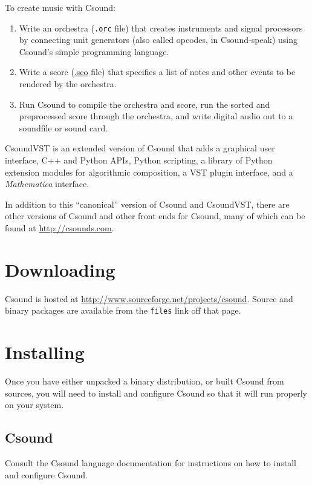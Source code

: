 \documentclass[10pt,letterpaper,onecolumn]{ltxguide}
\begin{document}
To create music with Csound:

\begin{enumerate}
\item Write an orchestra (\texttt{.orc} file) that creates instruments and signal processors by connecting unit generators (also called opcodes, in Csound-speak) using Csound's simple programming language.
\item Write a score (\url{.sco} file) that specifies a list of notes and other events to be rendered by the orchestra.
\item Run Csound to compile the orchestra and score, run the sorted and preprocessed score through the orchestra, and write digital audio out to a soundfile or sound card.
\end{enumerate}

CsoundVST is an extended version of Csound that adds a graphical user interface, C++ and Python APIs, Python scripting, a library of Python extension modules for algorithmic composition, a VST plugin interface, and a \emph{Mathematica} interface.

In addition to this ``canonical'' version of Csound and CsoundVST, there are other versions of Csound and other front ends for Csound, many of which can be found at \url{http://csounds.com}.

\section{Downloading}

Csound is hosted at \url{http://www.sourceforge.net/projects/csound}. \linebreak Source and binary packages are available from the \texttt{files} link off that page.

\section{Installing}

Once you have either unpacked a binary distribution, or built Csound from sources, you will need to install and configure Csound so that it will run properly on your system. 

\subsection{Csound}

Consult the Csound language documentation for instructions on how to install and configure Csound.
\end{document}
